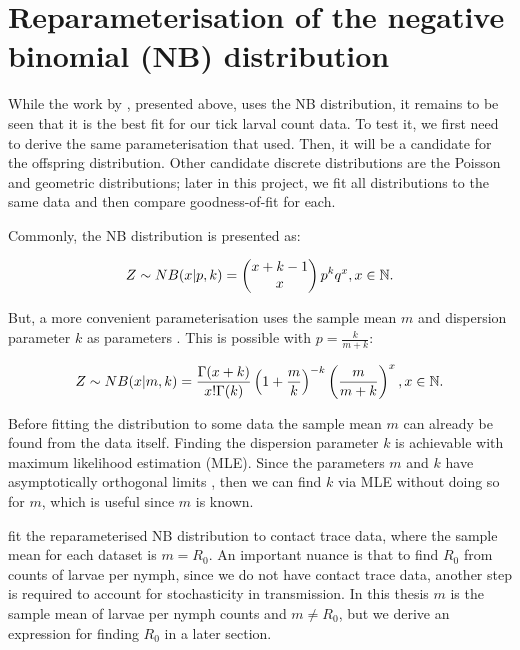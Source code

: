 \documentclass[hidelinks]{article}
\begin{document}
\newpage

\section{Reparameterisation of the negative binomial (NB) distribution}

While the work by \citet{LloydSmith2005}, presented above, uses the NB distribution, it remains to be seen that it is the best fit for our tick larval count data. To test it, we first need to derive the same parameterisation that \citet{LloydSmith2005} used. Then, it will be a candidate for the offspring distribution. Other candidate discrete distributions are the Poisson and geometric distributions; later in this project, we fit all distributions to the same data and then compare goodness-of-fit for each.

Commonly, the NB distribution is presented as:

\begin{equation}\label{NegBinom}
	Z \sim NB(x | p, k) = \left(\begin{matrix}x+k-1 \\ x \end{matrix}\right) \space p^k q^x, \space \space \space \space \space x \in \mathbb{N}.
\end{equation}

But, a more convenient parameterisation uses the sample mean $ m $ and dispersion parameter $ k $ as parameters \citep{Rice2007}. This is possible with $ p = \frac{k}{m+k} $:

\begin{equation}\label{NegBinomReparam}
    Z \sim NB(x | m, k) = \frac{\Gamma(x+k)}{x!\Gamma(k)} \space \left(1+\frac{m}{k}\right)^{-k} \space \left(\frac{m}{m+k}\right)^x, \space \space \space \space \space x \in \mathbb{N}.
\end{equation}

Before fitting the distribution to some data the sample mean $ m $ can already be found from the data itself. Finding the dispersion parameter $ k $ is achievable with maximum likelihood estimation (MLE). Since the parameters $ m $ and $ k $ have asymptotically orthogonal limits \citep{LloydSmith2005}, then we can find $ k $ via MLE without doing so for $ m $, which is useful since $ m $ is known.

\citet{LloydSmith2005} fit the reparameterised NB distribution to contact trace data, where the sample mean for each dataset is $ m=R_0 $. An important nuance is that to find $ R_0 $ from counts of larvae per nymph, since we do not have contact trace data, another step is required to account for stochasticity in transmission. In this thesis $ m $ is the sample mean of larvae per nymph counts and $ m \ne R_0 $, but we derive an expression for finding $ R_0 $ in a later section.
\end{document}
